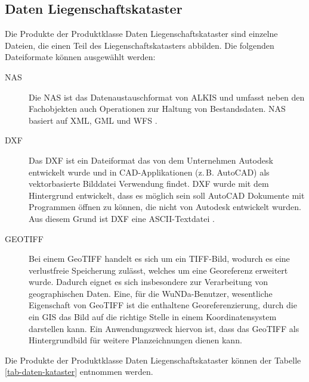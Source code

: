 \subsection{Daten Liegenschaftskataster}

Die Produkte der Produktklasse Daten Liegenschaftskataster sind einzelne Dateien, die einen Teil des Liegenschaftskatasters abbilden. Die folgenden Dateiformate können ausgewählt werden:
\begin{description}
\item[NAS] Die \ac{NAS} ist das Datenaustauschformat von ALKIS und umfasst neben den Fachobjekten auch Operationen zur Haltung von Bestandsdaten. \ac{NAS} basiert auf \ac{XML}, \ac{GML} und \ac{WFS} \autocite[vgl.][]{sachsen-nas}.

\item[DXF] Das \ac{DXF} ist ein Dateiformat das von dem Unternehmen Autodesk entwickelt wurde und in \ac{CAD}-Applikationen (z.\,B. AutoCAD) als vektorbasierte Bilddatei Verwendung findet.
\ac{DXF} wurde mit dem Hintergrund entwickelt, dass es möglich sein soll AutoCAD Dokumente mit Programmen öffnen zu können, die nicht von Autodesk entwickelt wurden. Aus diesem Grund ist \ac{DXF} eine ASCII-Textdatei \autocite[vgl.][]{fileinfo-dxf}.

\item[GEOTIFF] 
Bei einem GeoTIFF handelt es sich um ein TIFF-Bild, wodurch es eine verlustfreie Speicherung zulässt, welches um eine Georeferenz erweitert wurde.
Dadurch eignet es sich insbesondere zur Verarbeitung von geographischen Daten. \autocite[vgl.][]{wiki-geotiff}
Eine, für die \ac{WuNDa}-Benutzer, wesentliche Eigenschaft von GeoTIFF ist die enthaltene Georeferenzierung, durch die ein \ac{GIS} das Bild auf die richtige Stelle in einem Koordinatensystem darstellen kann.
Ein Anwendungszweck hiervon ist, dass das GeoTIFF als Hintergrundbild für weitere Planzeichnungen dienen kann.
\end{description}

Die Produkte der Produktklasse Daten Liegenschaftskataster können der Tabelle \ref{tab-daten-kataster} entnommen werden.

